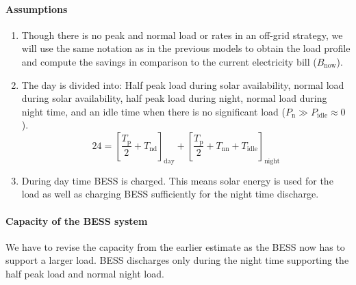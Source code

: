 \documentclass[a4paper]{article}
\begin{document}
\paragraph{Assumptions}
\begin{enumerate}
    \item Though there is no peak and normal load or rates in an off-grid strategy,
    we will use the same notation as in the previous models to obtain the
    load profile and compute the savings in comparison to the current electricity bill
    ($B_\text{now}$). 
    \item The day is divided into: Half peak load during solar availability,
    normal load during solar availability, 
    half peak load during night, normal load during night time, and an idle time 
    when there is no significant load ($P_\text{n} \gg P_\text{idle}\approx 0$).
    \begin{equation}
        24 = \left[ \frac{T_\text{p}}{2} + T_\text{nd} \right]_\text{day} 
        + \left[ \frac{T_\text{p}}{2} + T_\text{nn} + T_\text{idle} \right]_\text{night}
    \end{equation}
    \item During day time BESS is charged. This means solar
    energy is used for the load as well as charging BESS sufficiently
    for the night time discharge.

\end{enumerate}

\paragraph{Capacity of the BESS system} We have to revise the capacity from the
earlier estimate as the BESS now has to support a larger load.  BESS
discharges only during the night time supporting the half peak load and normal night load. 
\end{document}
